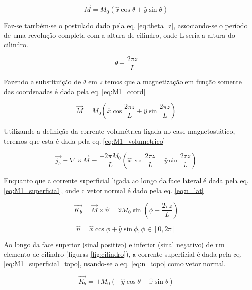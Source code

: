 \documentclass[a4paper, 12pt, twocolumn]{article}
\begin{document}
\begin{equation} \label{eq:M1}
	\vec{M} = M_0 (\hat{x} \cos{\theta} + \hat{y}\sin{\theta})
\end{equation}

Faz-se também-se o postulado dado pela eq. \ref{eq:theta_z}, associando-se o período de uma revolução completa com a altura do cilindro, onde L seria a altura do cilindro. 

\begin{equation} \label{eq:theta_z}
  \theta = \frac{2 \pi z}{L}
\end{equation}

Fazendo a substituição de $\theta$ em $z$ temos que a magnetização em função somente das coordenadas é dada pela eq. \ref{eq:M1_coord}

\begin{equation} \label{eq:M1_coord}
  \vec{M} = M_0 (\hat{x} \cos{\frac{2 \pi z}{L}} + \hat{y}\sin{\frac{2 \pi z}{L}})
\end{equation}

Utilizando  a definição da corrente volumétrica ligada no caso magnetostático, teremos que esta é dada pela eq. \ref{eq:M1_volumetrico}

\begin{equation} \label{eq:M1_volumetrico}
  \vec{j_b} = \nabla \times \vec{M} = \frac{-2 \pi M_0}{L}(\hat{x}\cos{\frac{2 \pi z}{L}} + \hat{y}\sin{\frac{2 \pi z}{L}})
\end{equation}

Enquanto que a corrente superficial ligada ao longo da face lateral é dada pela eq. \ref{eq:M1_superficial}, onde o vetor normal é dado pela eq. \ref{eq:n_lat}

\begin{equation} \label{eq:M1_superficial}
  \vec{K_b} = \vec{M} \times \hat{n} = \hat{z} M_0 \sin{(\phi - \frac{2 \pi z}{L})}
\end{equation}

\begin{equation} \label{eq:n_lat}
	\hat{n} = \hat{x} \cos{\phi} + \hat{y} \sin{\phi}, \phi \in [0, 2\pi]
\end{equation}

Ao longo da face superior (sinal positivo) e inferior (sinal negativo) de um elemento de cilindro (figuras \ref{fig:cilindro}), a corrente superficial é dada pela eq. \ref{eq:M1_superficial_topo}, usando-se a eq. \ref{eq:n_topo} como vetor normal.

\begin{equation} \label{eq:M1_superficial_topo}
	\vec{K_b} = \pm M_0(-\hat{y} \cos{\theta} + \hat{x}\sin{\theta})
\end{equation}
\end{document}
